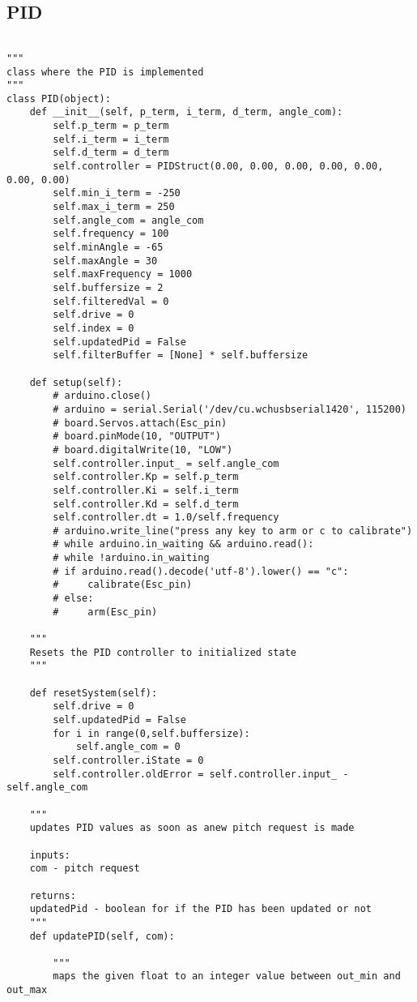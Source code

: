 \documentclass[11pt]{article}
\begin{document}
\subsection{PID}
\label{sec:orgf576132}
\begin{verbatim}

"""
class where the PID is implemented
"""
class PID(object):
    def __init__(self, p_term, i_term, d_term, angle_com):
        self.p_term = p_term
        self.i_term = i_term
        self.d_term = d_term
        self.controller = PIDStruct(0.00, 0.00, 0.00, 0.00, 0.00, 0.00, 0.00)
        self.min_i_term = -250
        self.max_i_term = 250
        self.angle_com = angle_com
        self.frequency = 100
        self.minAngle = -65
        self.maxAngle = 30
        self.maxFrequency = 1000
        self.buffersize = 2
        self.filteredVal = 0
        self.drive = 0
        self.index = 0
        self.updatedPid = False
        self.filterBuffer = [None] * self.buffersize

    def setup(self):
        # arduino.close()
        # arduino = serial.Serial('/dev/cu.wchusbserial1420', 115200)
        # board.Servos.attach(Esc_pin)
        # board.pinMode(10, "OUTPUT")
        # board.digitalWrite(10, "LOW")
        self.controller.input_ = self.angle_com
        self.controller.Kp = self.p_term
        self.controller.Ki = self.i_term
        self.controller.Kd = self.d_term
        self.controller.dt = 1.0/self.frequency
        # arduino.write_line("press any key to arm or c to calibrate")
        # while arduino.in_waiting && arduino.read():
        # while !arduino.in_waiting
        # if arduino.read().decode('utf-8').lower() == "c":
        #     calibrate(Esc_pin)
        # else:
        #     arm(Esc_pin)

    """
    Resets the PID controller to initialized state
    """

    def resetSystem(self):
        self.drive = 0
        self.updatedPid = False
        for i in range(0,self.buffersize):
            self.angle_com = 0
        self.controller.iState = 0
        self.controller.oldError = self.controller.input_ - self.angle_com

    """
    updates PID values as soon as anew pitch request is made

    inputs:
    com - pitch request

    returns:
    updatedPid - boolean for if the PID has been updated or not
    """
    def updatePID(self, com):

        """
        maps the given float to an integer value between out_min and out_max


\end{verbatim}
\end{document}
